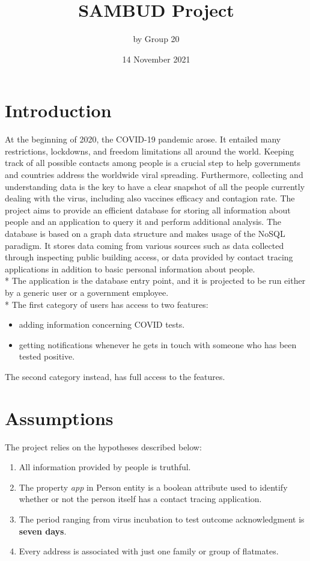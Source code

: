 \documentclass[a4paper, 12p]{article}
\title{\Large{\textbf{SAMBUD Project}}}
\author{by Group 20}
\date{14 November 2021}
\begin{document}
\maketitle

\section{Introduction}
At the beginning of 2020, the COVID-19 pandemic arose. It entailed many restrictions, lockdowns, and freedom limitations all around the world.
Keeping track of all possible contacts among people is a crucial step to help governments and countries address the worldwide viral spreading.
Furthermore, collecting and understanding data is the key to have a clear snapshot of all the people currently dealing with the virus, including also vaccines efficacy and contagion rate.
The project aims to provide an efficient database for storing all information about people and an application to query it and perform additional analysis.
The database is based on a graph data structure and makes usage of the NoSQL paradigm.
It stores data coming from various sources such as data collected through inspecting public building access, or data provided by contact tracing applications in addition to basic personal information about people.
\\* The application is the database entry point, and it is projected to be run either by a generic user or a government employee.
\\* The first category of users has access to two features:
\begin{itemize}
    \item adding information concerning COVID tests.
    \item getting notifications whenever he gets in touch with someone who has been tested positive.
\end{itemize}
The second category instead, has full access to the features.

\section{Assumptions}
The project relies on the hypotheses described below:

\begin{enumerate}
    \item All information provided by people is truthful.
    \item The property \textit{app} in Person entity is a boolean attribute used to identify whether or not the person itself has a contact tracing application.
    \item The period ranging from virus incubation to test outcome acknowledgment is \textbf{seven days}.
    \item Every address is associated with just one family or group of flatmates.
\end{enumerate}
\end{document}
